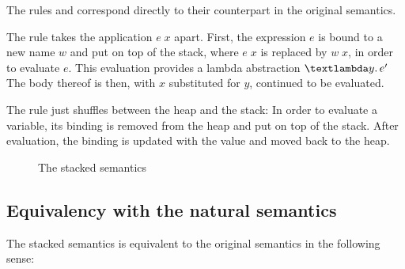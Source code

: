 \documentclass{jfp1}
\newtheorem{lemma}{Lemma}
\theoremstyle{nonumberbreak}
\newcommand{\sApp}[2]{#1\;#2}
\newcommand{\sLam}[2]{\text{\textlambda} #1.\, #2}
\newcommand{\sLet}[2]{\text{\textsf{let}}\ #1\ \text{\textsf{in}}\ #2}
\newcommand{\ssred}[4]{#1 : #2 \Downarrow^{\textrm{S}} #3 : #4}
\newcommand{\sRule}[1]{\text{{\textsc{#1}}}}
\newcommand{\dom}[1]{\text{dom}\;#1}
\newcommand{\xeng}{x_1 = e_1, \ldots, x_n = e_n}
\newcommand{\xen}{x_1\mapsto e_1, \ldots, x_n\mapsto e_n}
\begin{document}
The rules \sRule{Lam} and \sRule{Let} correspond directly to their counterpart in the original semantics.

The rule \sRule{App} takes the application $\sApp e x$ apart. First, the expression $e$ is bound to a new name $w$ and put on top of the stack, where $\sApp e x$ is replaced by $\sApp w x$, in order to evaluate $e$. This evaluation provides a lambda abstraction $\sLam y {e'}$ The body thereof is then, with $x$ substituted for $y$, continued to be evaluated.

The rule \sRule{Var} just shuffles between the heap and the stack: In order to evaluate a variable, its binding is removed from the heap and put on top of the stack. After evaluation, the binding is updated with the value and moved back to the heap.



\begin{figure}
\caption{The stacked semantics}
\label{fig:stacksem}
\end{figure}

\subsection{Equivalency with the natural semantics}

The stacked semantics is equivalent to the original semantics in the following sense:
\end{document}
